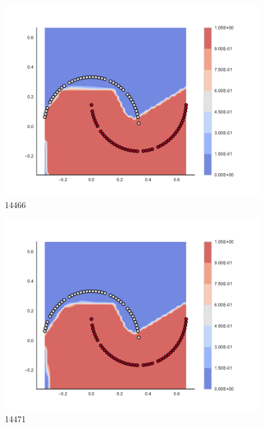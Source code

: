 \begin{subfigure}[b]{0.09\textwidth}
    \includegraphics[clip, trim=2.35cm 1.75cm 4.5cm 0cm,width=\textwidth]{img/convergence/14466.pdf}
    \caption{14466}
    \label{fig:convergence_14466}
\end{subfigure}
%
\begin{subfigure}[b]{0.09\textwidth}
    \includegraphics[clip, trim=2.35cm 1.75cm 4.5cm 0cm,width=\textwidth]{img/convergence/14471.pdf}
    \caption{14471}
    \label{fig:convergence_14471}
\end{subfigure}
%
